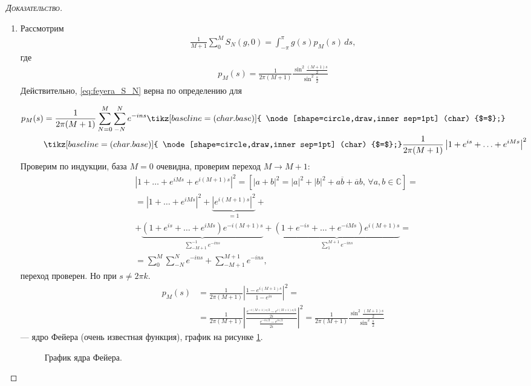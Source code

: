 \documentclass[../complex-analysis.tex]{subfiles}
\begin{document}
\begin{proof}[\normalfont\textsc{Доказательство}]
\begin{enumerate}
\item Рассмотрим 
 \begin{align}
  \label{eq:feyera_S_N}
  \frac{1}{M+1}\sum_{0}^{M} S_N(g,0) = \int_{-\pi}^{\pi}g(s)p_M(s)\,ds,
 \end{align} где
 \begin{align*}
  p_M(s) = \frac{1}{2 \pi (M+1)} \frac{ \sin^{2} \frac{(M+1)s}{2}}{\sin^{2} \frac{s}{2}}
 \end{align*} Действительно, \eqref{eq:feyera_S_N} верна по определению для
 {
	 \newcommand*\circled[1]{\tikz[baseline=(char.base)]{
  \node[shape=circle,draw,inner sep=1pt] (char) {#1};}}
 \begin{align*}
	 p_M(s) &= \frac{1}{2\pi (M+1)} \sum_{N=0}^{M} \sum_{-N}^{N} e^{-ins} \circled{$=$} \\
			&\circled{$=$} \frac{1}{2\pi (M+1)} \left| 1 + e^{is} + \ldots + e^{iMs} \right|^{2}
 \end{align*} Проверим \circled{$=$} по индукции, база $ M = 0 $ очевидна, проверим переход $M \to M + 1$: 
 \begin{align*}
  &\left| 1+\ldots+e^{iMs} + e^{i(M+1)s} \right|^{2} = \left[|a + b|^2 = |a|^2 + |b|^2 + a \overline b + \overline a b, \, \forall a, b \in \mathbb C\right] = \\
  &= \left| 1+\ldots+e^{iMs} \right|^{2} + \underbrace{\left| e^{i(M+1)s} \right|^{2}}_{=1} + \\ 
  &+ \underbrace{(1+e^{is}+ \ldots + e^{iMs})e^{-i(M+1)s}}_{\sum_{-M + 1}^{-1} e^{-ins}} + \underbrace{(1 + e^{-is} + \ldots + e^{-iMs})e^{i(M+1)s}}_{\sum_{1}^{M + 1} e^{-ins}} = \\
  &= \sum_{0}^{M} \sum_{-N}^{N}e^{-ins} + \sum_{-M+1}^{M+1} e^{-ins},
 \end{align*} переход проверен. Но при $ s \neq 2\pi k $.
 \begin{align*}
  p_M(s) &= \frac{1}{2 \pi (M+1)} \left| \frac{1-e^{i(M+1)s}}{1-e^{is}} \right|^{2} = \\
  &= \frac{1}{2 \pi (M+1)}  \left|\frac{\frac{e^{-i(M+1)s / 2} - e^{i(M+1)s / 2}}{2i}}{\frac{e^{-is / 2} - e^{is / 2}}{2i}} \right|^{2} = \frac{1}{2 \pi (M+1)} \frac{ \sin^{2} \frac{(M+1)s}{2}}{\sin^{2} \frac{s}{2}}
 \end{align*} --- ядро Фейера (очень известная функция), график на рисунке \ref{fig:feyer_kernel_plot}.
\begin{figure}[ht]
    \centering
    \caption{График ядра Фейера.}
    \label{fig:feyer_kernel_plot}
\end{figure}
}


\end{enumerate}
\end{proof}
\end{document}
